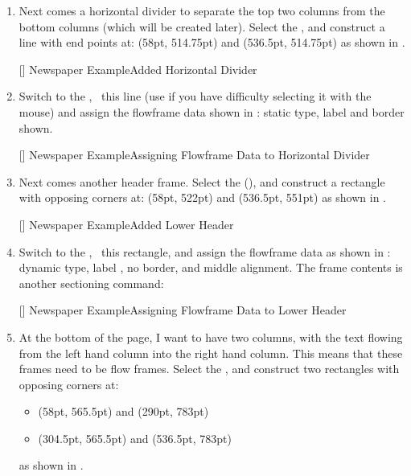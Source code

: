 \begin{enumerate}
[]
{}
{Newspaper Example\dash Assigning Flowframe Data to L Shaped
Divider}

\item Next comes a horizontal divider to separate the top two
columns from the bottom columns (which will be created
later). Select the , and construct a line
with end points at: (58pt, 514.75pt) and (536.5pt, 514.75pt) as shown
in .

[]
{}
{Newspaper Example\dash Added Horizontal Divider}

\item Switch to the , \select\
this line (use  if you have difficulty
selecting it with the mouse) and assign the \gls{flowframe} data shown in
\figureref{fig:news17}: static type, label \qt{hline} and border shown.

[]
{}
{Newspaper Example\dash Assigning Flowframe Data to
Horizontal Divider}

\item Next comes another header frame. Select the
 (),
and construct a rectangle with opposing corners at:
(58pt, 522pt) and (536.5pt, 551pt) as shown in .

[]
{}
{Newspaper Example\dash Added Lower Header}

\item Switch to the , \select\
this rectangle, and assign the \gls{flowframe} data as shown in
\figureref{fig:news19}: dynamic type, label , no
border, and middle alignment. The frame contents is another sectioning
command:
\begin{compactcodebox}
\end{compactcodebox}

[]
{}
{Newspaper Example\dash Assigning Flowframe Data to Lower
Header}

\item At the bottom of the page, I want to have two columns,
with the text flowing from the left hand column into the right
hand column. This means that these frames need to be flow frames.
Select the \tool{rectangle}, and
construct two rectangles with opposing corners at:
\begin{itemize}
\item (58pt, 565.5pt) and (290pt, 783pt)
\item (304.5pt, 565.5pt) and (536.5pt, 783pt)
\end{itemize}
as shown in .


\end{enumerate}

